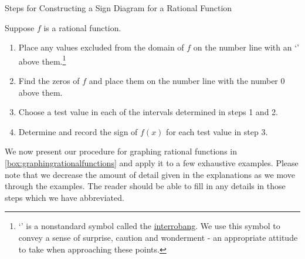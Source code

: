 \label{rationalsigndiagram}

\begin{floatbox}[label=box:signdiagramforrationalfunction]{Steps for Constructing a Sign Diagram for a Rational Function}

Suppose $f$ is a rational function. 

\begin{enumerate}

\item  Place any values excluded from the domain of  $f$ on the number line with an `\textinterrobang' above them.\footnote{ `\textinterrobang' is a nonstandard symbol called the \href{http://en.wikipedia.org/wiki/Interrobang}{\underline{interrobang}}.   We use this symbol to convey a sense of surprise, caution and wonderment - an appropriate attitude to take when approaching these points.}   

\item  Find the zeros of $f$ and place them on the number line with the number $0$ above them.

\item  Choose a test value in each of the intervals determined in steps 1 and 2.

\item  Determine and record the sign of $f(x)$ for each test value in step 3.

\end{enumerate}

\end{floatbox}

We now present our procedure for graphing rational functions in \autoref{box:graphingrationalfunctions} and apply it to a few exhaustive examples.  Please note that we decrease the amount of detail given in the explanations as we move through the examples.  The reader should be able to fill in any details in those steps which we have abbreviated.

